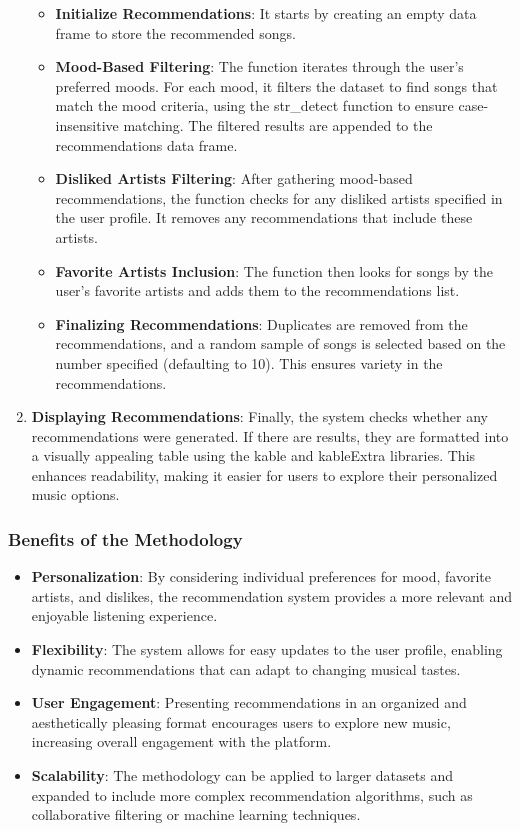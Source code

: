 \documentclass[
]{article}
\begin{document}
\begin{enumerate}
  \begin{itemize}
  \item
    \textbf{Initialize Recommendations}: It starts by creating an empty
    data frame to store the recommended songs.
  \item
    \textbf{Mood-Based Filtering}: The function iterates through the
    user's preferred moods. For each mood, it filters the dataset to
    find songs that match the mood criteria, using the str\_detect
    function to ensure case-insensitive matching. The filtered results
    are appended to the recommendations data frame.
  \item
    \textbf{Disliked Artists Filtering}: After gathering mood-based
    recommendations, the function checks for any disliked artists
    specified in the user profile. It removes any recommendations that
    include these artists.
  \item
    \textbf{Favorite Artists Inclusion}: The function then looks for
    songs by the user's favorite artists and adds them to the
    recommendations list.
  \item
    \textbf{Finalizing Recommendations}: Duplicates are removed from the
    recommendations, and a random sample of songs is selected based on
    the number specified (defaulting to 10). This ensures variety in the
    recommendations.
  \end{itemize}
\item
  \textbf{Displaying Recommendations}: Finally, the system checks
  whether any recommendations were generated. If there are results, they
  are formatted into a visually appealing table using the kable and
  kableExtra libraries. This enhances readability, making it easier for
  users to explore their personalized music options.
\end{enumerate}

\subsubsection{Benefits of the
Methodology}\label{benefits-of-the-methodology}

\begin{itemize}
\item
  \textbf{Personalization}: By considering individual preferences for
  mood, favorite artists, and dislikes, the recommendation system
  provides a more relevant and enjoyable listening experience.
\item
  \textbf{Flexibility}: The system allows for easy updates to the user
  profile, enabling dynamic recommendations that can adapt to changing
  musical tastes.
\item
  \textbf{User Engagement}: Presenting recommendations in an organized
  and aesthetically pleasing format encourages users to explore new
  music, increasing overall engagement with the platform.
\item
  \textbf{Scalability}: The methodology can be applied to larger
  datasets and expanded to include more complex recommendation
  algorithms, such as collaborative filtering or machine learning
  techniques.
\end{itemize}
\end{document}

